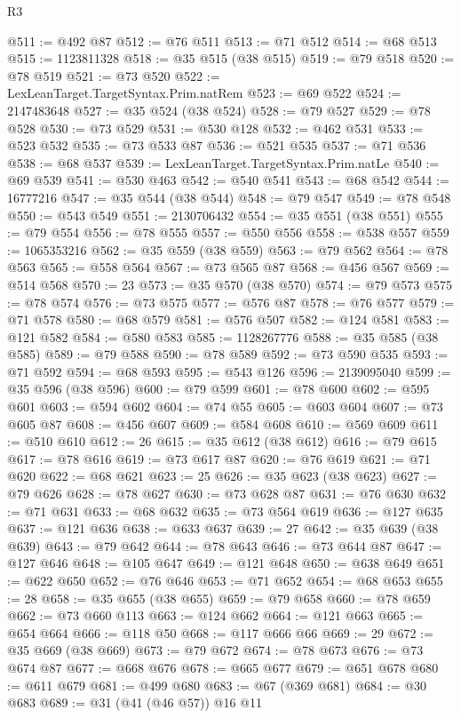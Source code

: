 \begin{lexlean}{R3}
\begin{coremodule}
@511 := @492 @87
@512 := @76 @511
@513 := @71 @512
@514 := @68 @513
@515 := 1123811328
@518 := @35 @515 (@38 @515)
@519 := @79 @518
@520 := @78 @519
@521 := @73 @520
@522 := LexLeanTarget.TargetSyntax.Prim.natRem
@523 := @69 @522
@524 := 2147483648
@527 := @35 @524 (@38 @524)
@528 := @79 @527
@529 := @78 @528
@530 := @73 @529
@531 := @530 @128
@532 := @462 @531
@533 := @523 @532
@535 := @73 @533 @87
@536 := @521 @535
@537 := @71 @536
@538 := @68 @537
@539 := LexLeanTarget.TargetSyntax.Prim.natLe
@540 := @69 @539
@541 := @530 @463
@542 := @540 @541
@543 := @68 @542
@544 := 16777216
@547 := @35 @544 (@38 @544)
@548 := @79 @547
@549 := @78 @548
@550 := @543 @549
@551 := 2130706432
@554 := @35 @551 (@38 @551)
@555 := @79 @554
@556 := @78 @555
@557 := @550 @556
@558 := @538 @557
@559 := 1065353216
@562 := @35 @559 (@38 @559)
@563 := @79 @562
@564 := @78 @563
@565 := @558 @564
@567 := @73 @565 @87
@568 := @456 @567
@569 := @514 @568
@570 := 23
@573 := @35 @570 (@38 @570)
@574 := @79 @573
@575 := @78 @574
@576 := @73 @575
@577 := @576 @87
@578 := @76 @577
@579 := @71 @578
@580 := @68 @579
@581 := @576 @507
@582 := @124 @581
@583 := @121 @582
@584 := @580 @583
@585 := 1128267776
@588 := @35 @585 (@38 @585)
@589 := @79 @588
@590 := @78 @589
@592 := @73 @590 @535
@593 := @71 @592
@594 := @68 @593
@595 := @543 @126
@596 := 2139095040
@599 := @35 @596 (@38 @596)
@600 := @79 @599
@601 := @78 @600
@602 := @595 @601
@603 := @594 @602
@604 := @74 @55
@605 := @603 @604
@607 := @73 @605 @87
@608 := @456 @607
@609 := @584 @608
@610 := @569 @609
@611 := @510 @610
@612 := 26
@615 := @35 @612 (@38 @612)
@616 := @79 @615
@617 := @78 @616
@619 := @73 @617 @87
@620 := @76 @619
@621 := @71 @620
@622 := @68 @621
@623 := 25
@626 := @35 @623 (@38 @623)
@627 := @79 @626
@628 := @78 @627
@630 := @73 @628 @87
@631 := @76 @630
@632 := @71 @631
@633 := @68 @632
@635 := @73 @564 @619
@636 := @127 @635
@637 := @121 @636
@638 := @633 @637
@639 := 27
@642 := @35 @639 (@38 @639)
@643 := @79 @642
@644 := @78 @643
@646 := @73 @644 @87
@647 := @127 @646
@648 := @105 @647
@649 := @121 @648
@650 := @638 @649
@651 := @622 @650
@652 := @76 @646
@653 := @71 @652
@654 := @68 @653
@655 := 28
@658 := @35 @655 (@38 @655)
@659 := @79 @658
@660 := @78 @659
@662 := @73 @660 @113
@663 := @124 @662
@664 := @121 @663
@665 := @654 @664
@666 := @118 @50
@668 := @117 @666 @66
@669 := 29
@672 := @35 @669 (@38 @669)
@673 := @79 @672
@674 := @78 @673
@676 := @73 @674 @87
@677 := @668 @676
@678 := @665 @677
@679 := @651 @678
@680 := @611 @679
@681 := @499 @680
@683 := @67 (@369 @681)
@684 := @30 @683
@689 := @31 (@41 (@46 @57)) @16 @11

\end{coremodule}
\end{lexlean}
